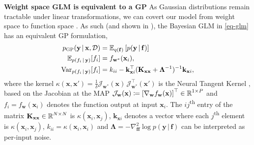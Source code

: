 \documentclass{article}
\newcommand{\weights}{\ensuremath{\mathbf{w}}}
\newcommand{\mbf}[1]{\mathbf{#1}}
\renewcommand{\mid}{\,|\,}
\newcommand{\vf}{\mbf{f}}
\newcommand{\vx}{\mbf{x}}
\newcommand{\vy}{\mbf{y}}
\newcommand{\vw}{\mbf{w}}
\newcommand{\Jac}[2]{\mathcal{J}_{#1}(#2)}
\newcommand{\JacT}[2]{\mathcal{J}_{#1}^\top(#2)}
\newcommand{\MKxx}{\mbf{K}_{\mbf{x}\mbf{x}}}
\newcommand{\vk}{\mbf{k}}
\newcommand{\myexpect}{\mathbb{E}}
\begin{document}
\textbf{Weight space GLM is equivalent to a GP}
As Gaussian distributions remain tractable under linear transformations, we can covert our model from
weight space to function space \citep[see Ch.~2.1 in ][]{rasmussen2006gaussian}.
As such (and shown in \citet{immer2021improving}), the Bayesian GLM in \cref{eq-glm} has an equivalent GP formulation,
\begin{subequations}  \label{eq-gp-pred-immer}
\begin{align}
  p_{\text{\sc GP}}(\vy \mid \vx, \mathcal{D}) &= \E_{q(\vf)} \left[ p(\vy \mid \vf)\right] \\ %
  \myexpect_{p(f_i \mid\vy)}[f_i] &= f_{\vw^{*}}(\vx_{i}), \\
  \mathrm{Var}_{p(f_i \mid \vy)}[f_i] &= k_{ii} - \vk_{\vx i}^\top ( \MKxx + \bm\Lambda^{-1})^{-1} \vk_{\vx i},
\end{align}
\end{subequations}
where the kernel $\kappa(\vx,\vx')=\frac{1}{\delta} \Jac{\weights^*}{\vx} \, \JacT{\weights^*}{\vx'}$ is the Neural Tangent Kernel \citep[NTK,][]{jacot2018neural},
based on the Jacobian at the MAP $\Jac{\weights}{\vx} \coloneqq \left[ \nabla_\weights f_\weights(\vx)\right]^\top \in \R^{1 \times P}$
and $f_i = f_\vw(\vx_i)$ denotes the function output at input $\vx_i$.
The $ij$\textsuperscript{th} entry of the matrix $\MKxx \in \R^{N \times N}$ is $\kappa(\vx_i,\vx_j)$, $\vk_{\vx i}$ denotes a vector where
each $j$\textsuperscript{th} element is $\kappa(\vx_i, \vx_j)$, $k_{ii} = \kappa(\vx_i, \vx_i)$ and $\bm\Lambda = - \nabla^2_{\vf \vf}\log p(\vy \mid \vf)$ can be interpreted as per-input noise.

\end{document}
